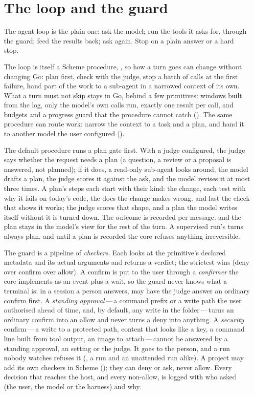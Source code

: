\chapter{The loop and the guard}

The agent loop is the plain one: ask the model; run the tools it asks for,
through the guard; feed the results back; ask again. Stop on a plain answer
or a hard stop.

The loop is itself a Scheme procedure, , so how a turn goes
can change without changing Go: plan first, check with the judge, stop a
batch of calls at the first failure, hand part of the work to a sub-agent in
a narrowed context of its own. What a turn must not skip stays in Go, behind
a few primitives: windows built from the log, only the model's own calls
run, exactly one result per call, and budgets and a progress guard that the
procedure cannot catch (). The same procedure can route work: narrow
the context to a task and a plan, and hand it to another model the user
configured ().

The default procedure runs a plan gate first. With a judge configured, the
judge says whether the request needs a plan (a question, a review or a
proposal is answered, not planned); if it does, a read-only
sub-agent looks around, the model drafts a plan, the judge scores it against
the ask, and the model revises it at most three times. A plan's steps each
start with their kind: the change, each test with why it fails on today's
code, the docs the change makes wrong, and last the check that shows it
works; the judge scores that shape, and a plan the model writes itself
without it is turned down. The outcome is
recorded per message, and the plan stays in the model's view for the rest
of the turn. A supervised run's turns always plan, and until a plan is
recorded the core refuses anything irreversible.

The guard is a pipeline of \emph{checkers}. Each looks at the primitive's
declared metadata and its actual arguments and returns a verdict; the
strictest wins (deny over confirm over allow). A confirm is put to the user
through a \emph{confirmer} the core implements as an event plus a wait, so
the guard never knows what a terminal is; in a session a person answers,
 may have the judge answer an ordinary confirm
first. A \emph{standing approval}\,---\,a command prefix or a write path
the user authorised ahead of time, and, by default, any write in the
folder\,---\,turns an ordinary confirm into an allow and never turns a deny
into anything. A \emph{security} confirm\,---\,a write to a protected
path, content that looks like a key, a command line built from tool output,
an image to attach\,---\,cannot be answered by a standing approval, an
\code{[approval]} setting or the judge. It goes to the person, and a run
nobody watches refuses it (, a  run and an
unattended run alike). A project may add
its own checkers in Scheme (); they can deny or ask,
never allow. Every decision that reaches the host, and every non-allow, is
logged with who asked (the user, the model or the harness) and why.

